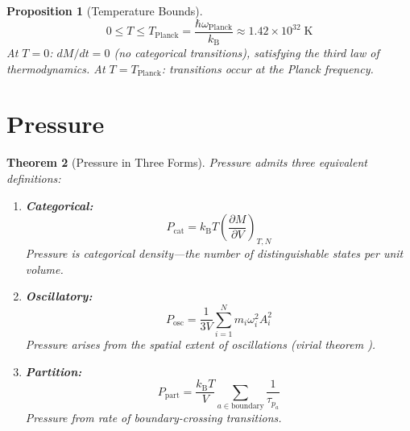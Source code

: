 \documentclass[twocolumn,10pt,a4paper]{article}
\theoremstyle{plain}
\newtheorem{theorem}{Theorem}[section]
\newtheorem{proposition}[theorem]{Proposition}
\theoremstyle{definition}
\theoremstyle{remark}
\newcommand{\kB}{k_{\mathrm{B}}}
\newcommand{\taup}{\tau_p}
\begin{document}
\begin{proposition}[Temperature Bounds]
\label{prop:temp_bounds}
\begin{equation}
    0 \leq T \leq T_{\mathrm{Planck}} = \frac{\hbar\omega_{\mathrm{Planck}}}{\kB} \approx 1.42 \times 10^{32}\;\mathrm{K}
\end{equation}
At $T = 0$: $dM/dt = 0$ (no categorical transitions), satisfying the third law of thermodynamics. At $T = T_{\mathrm{Planck}}$: transitions occur at the Planck frequency.
\end{proposition}

\section{Pressure}
\label{sec:pressure}

\begin{theorem}[Pressure in Three Forms]
\label{thm:pressure}
Pressure admits three equivalent definitions:
\begin{enumerate}
    \item \textbf{Categorical:}
    \begin{equation}
        P_{\mathrm{cat}} = \kB T \left(\frac{\partial M}{\partial V}\right)_{T,N}
    \end{equation}
    Pressure is categorical density---the number of distinguishable states per unit volume.

    \item \textbf{Oscillatory:}
    \begin{equation}
        P_{\mathrm{osc}} = \frac{1}{3V}\sum_{i=1}^{N} m_i \omega_i^2 A_i^2
    \end{equation}
    Pressure arises from the spatial extent of oscillations (virial theorem \cite{clausius1870}).

    \item \textbf{Partition:}
    \begin{equation}
        P_{\mathrm{part}} = \frac{\kB T}{V}\sum_{a \in \mathrm{boundary}} \frac{1}{\taup_a}
    \end{equation}
    Pressure from rate of boundary-crossing transitions.
\end{enumerate}
\end{theorem}
\end{document}
